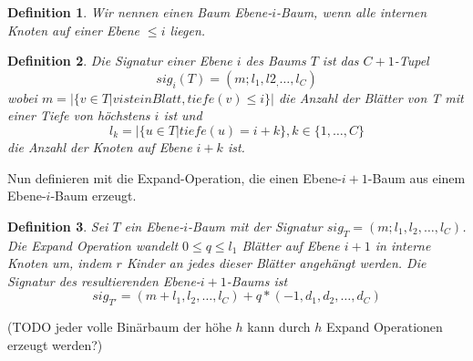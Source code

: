 \documentclass[a4paper,10pt,ngerman]{scrartcl}
\newtheorem{definition}{Definition}
\begin{document}
\begin{definition}
    Wir nennen einen Baum Ebene-$i$-Baum, wenn alle internen Knoten auf einer Ebene $\le i$ liegen. \\
\end{definition}

\begin{definition}
    Die Signatur einer Ebene $i$ des Baums $T$ ist das $C + 1$-Tupel \[sig_i(T) = (m;l_1,l2_, \dots, l_C)\]
wobei $m = |\{v \in T | v ist ein Blatt, tiefe(v) \le i\}|$ die Anzahl der Blätter von T mit einer Tiefe von höchstens $i$ ist und
    \[l_k = |\{u \in T | tiefe(u) = i + k\}, k \in \{1,\dots,C\}\]
die Anzahl der Knoten auf Ebene $i + k$ ist.
\end{definition}
Nun definieren mit die Expand-Operation, die einen Ebene-$i+1$-Baum aus einem Ebene-$i$-Baum erzeugt. \\
\begin{definition}
    Sei $T$ ein Ebene-$i$-Baum mit der Signatur $sig_T = (m;l_1,l_2,\dots,l_C)$. Die Expand Operation wandelt $0 \le q \le l_1$ Blätter auf Ebene $i + 1$ in interne Knoten um, indem $r$ Kinder an jedes dieser Blätter angehängt werden. Die Signatur des resultierenden Ebene-$i+1$-Baums ist
    \[sig_{T'} = (m + l_1, l_2, \dots, l_C) + q * (-1, d_1, d_2, \dots, d_C)\]
\end{definition}
(TODO jeder volle Binärbaum der höhe $h$ kann durch $h$ Expand Operationen erzeugt werden?) \\
\end{document}
